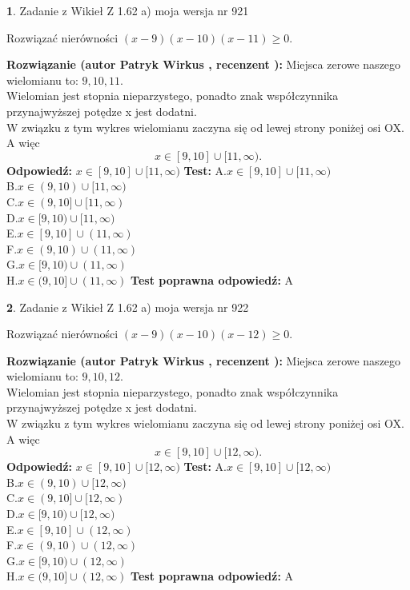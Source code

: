 \documentclass[12pt, a4paper]{article}
\theoremstyle{definition} %
\newtheorem{zad}{}
\newcommand{\zadStart}[1]{\begin{zad}#1\newline}
\newcommand{\zadStop}{\end{zad}}
\newcommand{\rozwStart}[2]{\noindent \textbf{Rozwiązanie (autor #1 , recenzent #2): }\newline}
\newcommand{\rozwStop}{\newline}
\newcommand{\odpStart}{\noindent \textbf{Odpowiedź:}\newline}
\newcommand{\odpStop}{\newline}
\newcommand{\testStart}{\noindent \textbf{Test:}\newline}
\newcommand{\testStop}{\newline}
\newcommand{\kluczStart}{\noindent \textbf{Test poprawna odpowiedź:}\newline}
\newcommand{\kluczStop}{\newline}
\begin{document}
\zadStart{Zadanie z Wikieł Z 1.62 a) moja wersja nr 921}

Rozwiązać nierówności $(x-9)(x-10)(x-11)\ge0$.
\zadStop
\rozwStart{Patryk Wirkus}{}
Miejsca zerowe naszego wielomianu to: $9, 10, 11$.\\
Wielomian jest stopnia nieparzystego, ponadto znak współczynnika przy\linebreak najwyższej potędze x jest dodatni.\\ W związku z tym wykres wielomianu zaczyna się od lewej strony poniżej osi OX. A więc $$x \in [9,10] \cup [11,\infty).$$
\rozwStop
\odpStart
$x \in [9,10] \cup [11,\infty)$
\odpStop
\testStart
A.$x \in [9,10] \cup [11,\infty)$\\
B.$x \in (9,10) \cup [11,\infty)$\\
C.$x \in (9,10] \cup [11,\infty)$\\
D.$x \in [9,10) \cup [11,\infty)$\\
E.$x \in [9,10] \cup (11,\infty)$\\
F.$x \in (9,10) \cup (11,\infty)$\\
G.$x \in [9,10) \cup (11,\infty)$\\
H.$x \in (9,10] \cup (11,\infty)$
\testStop
\kluczStart
A
\kluczStop



\zadStart{Zadanie z Wikieł Z 1.62 a) moja wersja nr 922}

Rozwiązać nierówności $(x-9)(x-10)(x-12)\ge0$.
\zadStop
\rozwStart{Patryk Wirkus}{}
Miejsca zerowe naszego wielomianu to: $9, 10, 12$.\\
Wielomian jest stopnia nieparzystego, ponadto znak współczynnika przy\linebreak najwyższej potędze x jest dodatni.\\ W związku z tym wykres wielomianu zaczyna się od lewej strony poniżej osi OX. A więc $$x \in [9,10] \cup [12,\infty).$$
\rozwStop
\odpStart
$x \in [9,10] \cup [12,\infty)$
\odpStop
\testStart
A.$x \in [9,10] \cup [12,\infty)$\\
B.$x \in (9,10) \cup [12,\infty)$\\
C.$x \in (9,10] \cup [12,\infty)$\\
D.$x \in [9,10) \cup [12,\infty)$\\
E.$x \in [9,10] \cup (12,\infty)$\\
F.$x \in (9,10) \cup (12,\infty)$\\
G.$x \in [9,10) \cup (12,\infty)$\\
H.$x \in (9,10] \cup (12,\infty)$
\testStop
\kluczStart
A
\kluczStop
\end{document}
